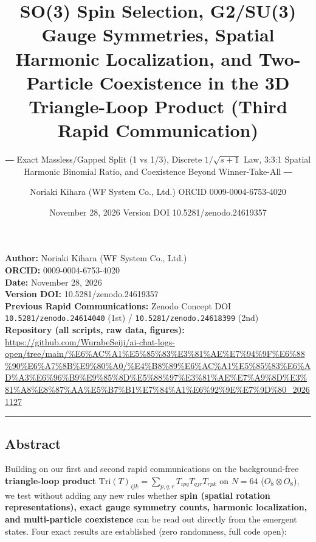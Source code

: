 \documentclass[
  a4paper,
]{article}
\title{SO(3) Spin Selection, G2/SU(3) Gauge Symmetries, Spatial Harmonic
Localization, and Two-Particle Coexistence in the 3D Triangle-Loop
Product (Third Rapid Communication)}
\subtitle{― Exact Massless/Gapped Split (1 vs 1/3), Discrete
\(1/\sqrt{s+1}\) Law, 3:3:1 Spatial Harmonic Binomial Ratio, and
Coexistence Beyond Winner-Take-All ―}
\author{Noriaki Kihara (WF System Co., Ltd.) ORCID 0009-0004-6753-4020}
\date{November 28, 2026 Version DOI 10.5281/zenodo.24619357}
\begin{document}
\maketitle

\textbf{Author:} Noriaki Kihara (WF System Co., Ltd.)\\
\textbf{ORCID:} 0009-0004-6753-4020\\
\textbf{Date:} November 28, 2026\\
\textbf{Version DOI:} 10.5281/zenodo.24619357\\
\textbf{Previous Rapid Communications:} Zenodo Concept DOI
\texttt{10.5281/\allowbreak{}zenodo.24614040} (1st) /
\texttt{10.5281/\allowbreak{}zenodo.24618399} (2nd)\\
\textbf{Repository (all scripts, raw data, figures):}
\url{https://github.com/WurabeSeiji/ai-chat-logs-open/tree/main/\%E6\%AC\%A1\%E5\%85\%83\%E3\%81\%AE\%E7\%94\%9F\%E6\%88\%90\%E6\%A7\%8B\%E9\%80\%A0/\%E4\%B8\%89\%E6\%AC\%A1\%E5\%85\%83\%E6\%AD\%A3\%E6\%96\%B9\%E9\%85\%8D\%E5\%88\%97\%E3\%81\%AE\%E7\%A9\%8D\%E3\%81\%A8\%E8\%87\%AA\%E5\%B7\%B1\%E7\%84\%A1\%E6\%92\%9E\%E7\%9D\%80\_20261127}

\begin{center}\rule{0.5\linewidth}{0.5pt}\end{center}

\subsection{Abstract}\label{abstract}

Building on our first and second rapid communications on the
background-free \textbf{triangle-loop product}
\(\mathrm{Tri}(T)_{ijk} = \sum_{p,q,r} T_{ipq} T_{qjr} T_{rpk}\) on
\(N = 64\) (\(O_8 \otimes O_8\)), we test without adding any new rules
whether \textbf{spin (spatial rotation representations), exact gauge
symmetry counts, harmonic localization, and multi-particle coexistence}
can be read out directly from the emergent states. Four exact results
are established (zero randomness, full code open):
\end{document}
